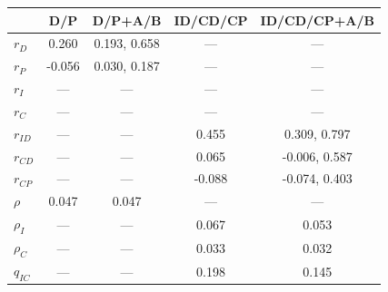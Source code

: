 \begin{supptable}
    \begin{center}
    
    \begin{tabular}{lcccc}
                       & D/P   & D/P+A/B      & ID/CD/CP & ID/CD/CP+A/B \\ \midrule
        $r_D$          & 0.260 & 0.193, 0.658 & ---      & ---          \\
        $r_P$          &-0.056 & 0.030, 0.187 & ---      & ---          \\
        $r_I$          & ---   & ---          & ---      & ---          \\
        $r_C$          & ---   & ---          & ---      & ---          \\
        $r_{ID}$       & ---   & ---          & 0.455    & 0.309, 0.797 \\
        $r_{CD}$       & ---   & ---          & 0.065    &-0.006, 0.587 \\
        $r_{CP}$       & ---   & ---          &-0.088    &-0.074, 0.403 \\
        $\rho$         & 0.047 & 0.047        & ---      & ---          \\
        $\rho_I$       & ---   & ---          & 0.067    & 0.053        \\
        $\rho_C$       & ---   & ---          & 0.033    & 0.032        \\
        $q_{IC}$       & ---   & ---          & 0.198    & 0.145        
    \end{tabular}
    
            \vspace{12pt}
            

\end{center}
\end{supptable}
